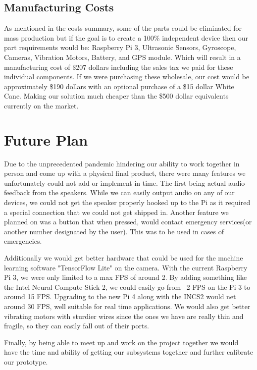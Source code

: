 \documentclass[letterpaper,12pt]{article}
\begin{document}
    
    \subsection{Manufacturing Costs}
    As mentioned in the costs summary, some of the parts could be eliminated for mass production but if the goal is to create a 100\% independent device then our part requirements would be: Raspberry Pi 3, Ultrasonic Sensors, Gyroscope, Cameras, Vibration Motors, Battery, and GPS module. Which will result in a manufacturing cost of \$207 dollars including the sales tax we paid for these individual components. If we were purchasing these wholesale, our cost would be approximately \$190 dollars with an optional purchase of a \$15 dollar White Cane. Making our solution much cheaper than the \$500 dollar equivalents currently on the market. 
    
\section{Future Plan}
Due to the unprecedented pandemic hindering our ability to work together in person and come up with a physical final product, there were many features we unfortunately could not add or implement in time. The first being actual audio feedback from the speakers. While we can easily output audio on any of our devices, we could not get the speaker properly hooked up to the Pi as it required a special connection that we could not get shipped in. Another feature we planned on was a button that when pressed, would contact emergency services(or another number designated by the user). This was to be used in cases of emergencies. \par

Additionally we would get better hardware that could be used for the machine learning software "TensorFlow Lite" on the camera. With the current Raspberry Pi 3, we were only limited to a max FPS of around 2. By adding something like the Intel Neural Compute Stick 2, we could easily go from ~2 FPS on the Pi 3 to around 15 FPS. Upgrading to the new Pi 4 along with the INCS2 would net around 30 FPS, well suitable for real time applications. We would also get better vibrating motors with sturdier wires since the ones we have are really thin and fragile, so they can easily fall out of their ports. \par

Finally, by being able to meet up and work on the project together we would have the time and ability of getting our subsystems together and further calibrate our prototype.
\newpage
\end{document}
